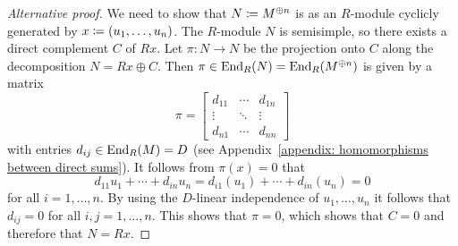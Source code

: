 \begin{proof}[Alternative proof]
  We need to show that $N \coloneqq M^{\oplus n}$ is as an $R$-module cyclicly generated by $x \coloneqq (u_1, \dotsc, u_n)$.
  The $R$-module $N$ is semisimple, so there exists a direct complement $C$ of $Rx$.
  Let $\pi \colon N \to N$ be the projection onto $C$ along the decomposition $N = Rx \oplus C$.
  Then $\pi \in \operatorname{End}_R(N) = \operatorname{End}_R(M^{\oplus n})$ is given by a matrix
  \[
      \pi
    = \begin{bmatrix}
        d_{11}  & \cdots  & d_{1n}  \\
        \vdots  & \ddots  & \vdots  \\
        d_{n1}  & \cdots  & d_{nn}
      \end{bmatrix}
  \]
  with entries $d_{ij} \in \operatorname{End}_R(M) = D$ (see Appendix~\ref{appendix: homomorphisms between direct sums}).
  It follows from $\pi(x) = 0$ that
  \[
      d_{11} u_1 + \dotsb + d_{in} u_n
    = d_{i1}(u_1) + \dotsb + d_{in}(u_n)
    = 0
  \]
  for all $i = 1, \dotsc, n$.
  By using the $D$-linear independence of $u_1, \dotsc, u_n$ it follows that $d_{ij} = 0$ for all $i, j = 1, \dotsc, n$.
  This shows that $\pi = 0$, which shows that $C = 0$ and therefore that $N = Rx$.
\end{proof}




